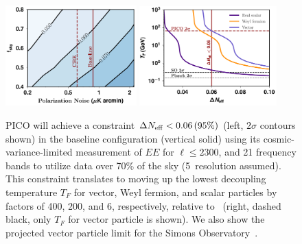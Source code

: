 \documentclass[PICOReport.tex]{subfiles}
\begin{document}
\begin{figure}[t!]
\begin{center}
\includegraphics[width=0.45\textwidth]{images/Neff_final.pdf}
\includegraphics[width=0.47\textwidth]{images/Tf_pico.pdf}
\vspace{-0.15in}
\caption{ \captiontext PICO will achieve a constraint $\Delta {N_{\rm eff}} < 0.06\, (95\%)$ (left, $2\sigma$ contours shown) in the baseline configuration (vertical solid) using its cosmic-variance-limited measurement of $EE$ for $\ell \leq 2300$, and 21 frequency bands to utilize data over 70\% of the sky (5\arcmin\ resolution assumed). This constraint translates to moving up the lowest decoupling temperature $T_{F}$ for vector, Weyl fermion, and scalar particles by factors of 400, 200, and 6, respectively, relative to \planck\ (right, dashed black, only $T_{F}$ for vector particle is shown). We also show the projected vector particle limit for the Simons Observatory~\citep{SOscience}. }
\label{fig:Neff_future}  
\end{center}
\vspace{-0.2in}
\end{figure}
\end{document}
